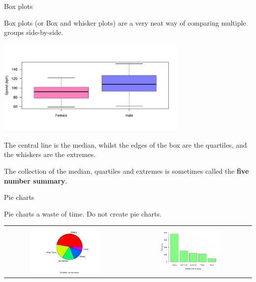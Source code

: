 \documentclass[12pt,xcolor=dvipsnames,handout,mathserif,aspectratio=169]{beamer}
\newcommand{\bgr}[1]{{\color{PineGreen} \textbf{#1}}}
\begin{document}
\begin{frame}{ Box plots  }

Box plots (or Box and whisker plots) are a very neat way of comparing multiple groups side-by-side.
\vspace{-1cm}
\begin{center}
\includegraphics[width=0.7\textwidth]{SpeedBoxplots.pdf}
\end{center}
\vspace{-1cm}
The central line is the median, whilst the edges of the box are the quartiles, and the whiskers are the extremes.\\
\pause
\begin{block}{}
The collection of the median, quartiles and extremes is sometimes called the \bgr{five number summary}.
\end{block}
\end{frame}

\begin{frame}{ Pie charts }

Pie charts a waste of time. Do not create pie charts.
\begin{center}
\begin{tabular}{cc}
\hspace{-1cm} \includegraphics[width=0.6\textwidth]{SeatBeltPieChartCompare.pdf} & \hspace{-1cm} \includegraphics[width=0.5\textwidth]{SeatBeltBarChartCompare.pdf} \\
\end{tabular}
\end{center}

\end{frame}
\end{document}
